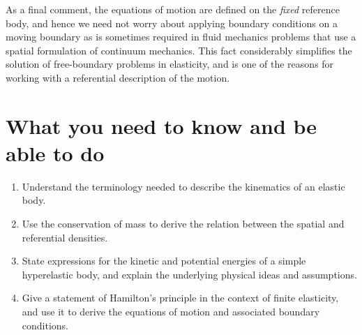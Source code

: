 \documentclass[a4paper,12pt]{paper}
\begin{document}
As a final comment, 
the equations of motion are defined on the \emph{fixed} reference body, and hence we need not worry about applying 
boundary conditions on a moving boundary as is sometimes required in fluid mechanics problems that use a spatial formulation 
of continuum mechanics. This fact considerably simplifies 
the solution of free-boundary problems in elasticity, and is one of the reasons for working with a referential description 
of the motion.

\section*{What you need to know and be able to do}
\begin{enumerate}
    \item[(i)] Understand the terminology needed to describe the kinematics of an elastic body.
    \item[(ii)] Use the conservation of mass to derive the relation between the spatial and referential densities.
    \item[(iii)] State expressions for the kinetic and potential energies of a simple hyperelastic body, and 
    explain the underlying physical ideas and assumptions.
    \item[(iv)] Give a statement of Hamilton's principle in the context of finite elasticity, and use it to derive 
    the equations of motion and associated boundary conditions.
\end{enumerate}
\end{document}
